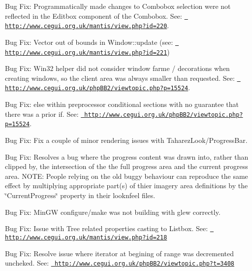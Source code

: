 \begin{DoxyItemize}
\item Bug Fix\+: Programmatically made changes to Combobox selection were not reflected in the Editbox component of the Combobox. See\+: \href{http://www.cegui.org.uk/mantis/view.php?id=220}{\texttt{ http\+://www.\+cegui.\+org.\+uk/mantis/view.\+php?id=220}}.
\item Bug Fix\+: Vector out of bounds in Window\+::update (see\+: \href{http://www.cegui.org.uk/mantis/view.php?id=221}{\texttt{ http\+://www.\+cegui.\+org.\+uk/mantis/view.\+php?id=221}})
\item Bug Fix\+: Win32 helper did not consider window farme / decorations when creating windows, so the client area was always smaller than requested. See\+: \href{http://www.cegui.org.uk/phpBB2/viewtopic.php?p=15524}{\texttt{ http\+://www.\+cegui.\+org.\+uk/php\+B\+B2/viewtopic.\+php?p=15524}}.
\item Bug Fix\+: \textquotesingle{}else\textquotesingle{} within preprocessor conditional sections with no guarantee that there was a prior \textquotesingle{}if\textquotesingle{}. See\+: \href{http://www.cegui.org.uk/phpBB2/viewtopic.php?p=15524}{\texttt{ http\+://www.\+cegui.\+org.\+uk/php\+B\+B2/viewtopic.\+php?p=15524}}.
\item Bug Fix\+: Fix a couple of minor rendering issues with Taharez\+Look/\+Progress\+Bar.
\item Bug Fix\+: Resolves a bug where the progress content was drawn into, rather than clipped by, the intersection of the the full progress area and the current progress area. N\+O\+TE\+: People relying on the old buggy behaviour can reproduce the same effect by multiplying appropriate part(s) of thier imagery area definitions by the \char`\"{}\+Current\+Progress\char`\"{} property in their looknfeel files.
\item Bug Fix\+: Min\+GW configure/make was not building with glew correctly.
\item Bug Fix\+: Issue with Tree related properties casting to Listbox. See\+: \href{http://www.cegui.org.uk/mantis/view.php?id=218}{\texttt{ http\+://www.\+cegui.\+org.\+uk/mantis/view.\+php?id=218}}
\item Bug Fix\+: Resolve issue where iterator at begining of range was decremented uncheked. See\+: \href{http://www.cegui.org.uk/phpBB2/viewtopic.php?t=3408}{\texttt{ http\+://www.\+cegui.\+org.\+uk/php\+B\+B2/viewtopic.\+php?t=3408}}
\end{DoxyItemize}

